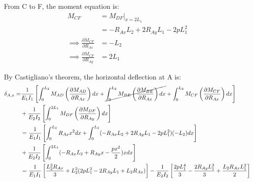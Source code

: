 From C to F, the moment equation is:
\begin{align*}
    M_{CF} &= M_{DF}|_{x=2L_1}  \\ 
    &= -R_{Ax}L_2 + 2R_{Ay}L_1 - 2pL_1^2 \\
    \implies \frac{\partial M_{CF}}{\partial R_{Ax}} &= -L_2 \\
    \implies \frac{\partial M_{CF}}{\partial R_{Ay}} &= 2L_1
\end{align*}

By Castigliano's theorem, the horizontal deflection at A is:
\begin{align*}
    \delta_{A,x} = & \frac{1}{E_1I_1} \left[\int_{0}^{L_2} M_{AD} \left(\frac{\partial M_{AD}}{\partial R_{Ax}}\right) dx
    + \cancel{\int_{0}^{L_2} M_{BE} \left(\frac{\partial M_{BE}}{\partial R_{Ax}}\right) dx}
    + \int_{0}^{L_2} M_{CF} \left(\frac{\partial M_{CF}}{\partial R_{Ax}}\right) dx
    \right] \\
    &+ \frac{1}{E_2I_2} \left[\int_{0}^{2 L_1} M_{DF} \left(\frac{\partial M_{DF}}{\partial R_{Ay}}\right) dx \right] \\
    &= \frac{1}{E_1I_1} \left[\int_{0}^{L_2} R_{Ax} x^2 dx + \int_{0}^{L_2} (-R_{Ax}L_2 + 2R_{Ay}L_1 - 2pL_1^2)(-L_2) dx \right] \\
    &+ \frac{1}{E_2I_2} \left[\int_{0}^{2 L_1} (-R_{Ax}L_2 + R_{Ay}x - \frac{px^2}{2})x dx \right] \\
    &= \frac{1}{E_1I_1} \left[\frac{L_2^3R_{Ax}}{3} + L_2^2(2pL_1^2 - 2R_{Ay}L_1 + L_2R_{Ax}) \right]
    - \frac{1}{E_2I_2} \left[\frac{2pL_1^4}{3} - \frac{2R_{Ay}L_1^3}{3} + \frac{L_2R_{Ax}L_1^2}{2} \right] \\
\end{align*}

